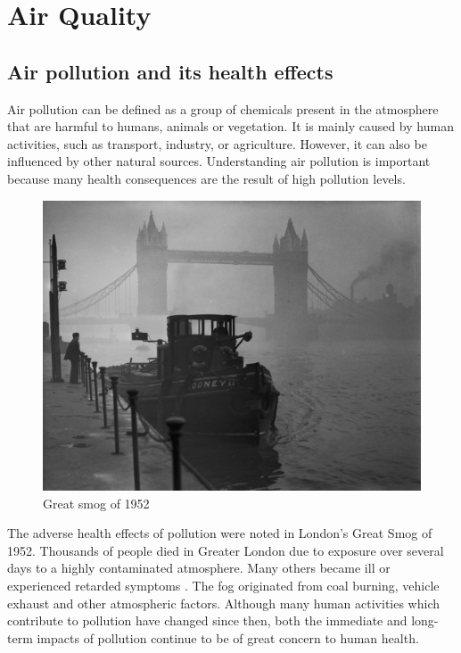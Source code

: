 \section{Air Quality}
\subsection{Air pollution and its health effects}
Air pollution can be defined as a group of chemicals present in the atmosphere that are harmful to humans, animals or vegetation. It is mainly caused by human activities, such as transport, industry, or agriculture. However, it can also be influenced by other natural sources. Understanding air pollution is important because many health consequences are the result of high pollution levels. 
\begin{figure}[h]
  \centering
  \includegraphics[scale=.8]{images/great_smog.jpg}
  \caption[Great smog of 1952]{Great smog of 1952\footnotemark}
  \label{fig:interaction_design}
\end{figure}


The adverse health effects of pollution were noted in London's Great Smog of 1952. Thousands of people died in Greater London due to exposure over several days to a highly contaminated atmosphere. Many others became ill or experienced retarded symptoms \cite{Bell2008}. The fog originated from coal burning, vehicle exhaust and other atmospheric factors. Although many human activities which contribute to pollution have changed since then, both the immediate and long-term impacts of pollution continue to be of great concern to human health.


